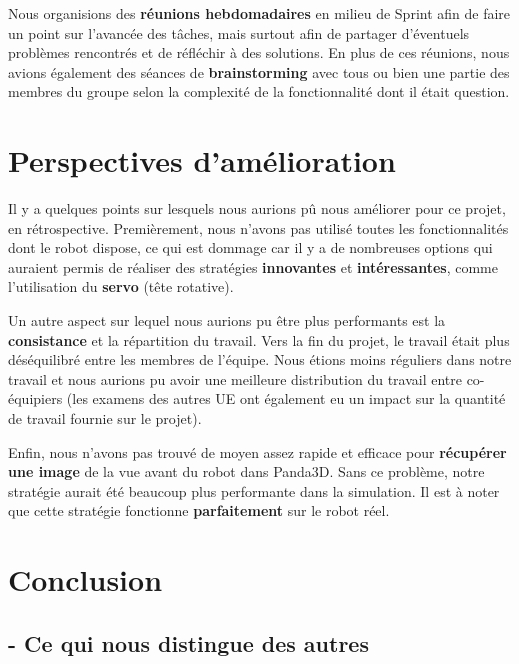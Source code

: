 \documentclass[12pt]{article}
\begin{document}
\hspace{\parindent}Nous organisions des \textbf{réunions hebdomadaires} en milieu de Sprint afin de faire un point sur l’avancée des tâches, mais surtout afin de partager d’éventuels problèmes rencontrés et de réfléchir à des solutions. En plus de ces réunions, nous avions également des séances de \textbf{brainstorming} avec tous ou bien une partie des membres du groupe selon la complexité de la fonctionnalité dont il était question.
 


\section*{Perspectives d'amélioration}

\hspace{\parindent}Il y a quelques points sur lesquels nous aurions pû nous améliorer pour ce projet, en rétrospective. Premièrement, nous n’avons pas utilisé toutes les fonctionnalités dont le robot dispose, ce qui est dommage car il y a de nombreuses options qui auraient permis de réaliser des stratégies \textbf{innovantes} et \textbf{intéressantes}, comme l'utilisation du \textbf{servo} (tête rotative).

\hspace{\parindent}Un autre aspect sur lequel nous aurions pu être plus performants est la \textbf{consistance} et la répartition du travail. Vers la fin du projet, le travail était plus déséquilibré entre les membres de l’équipe. Nous étions moins réguliers dans notre travail et nous aurions pu avoir une meilleure distribution du travail entre co-équipiers (les examens des autres UE ont également eu un impact sur la quantité de travail fournie sur le projet).

\hspace{\parindent} Enfin, nous n'avons pas trouvé de moyen assez rapide et efficace pour \textbf{récupérer une image} de la vue avant du robot dans Panda3D. Sans ce problème, notre stratégie aurait été beaucoup plus performante dans la simulation. Il est à noter que cette stratégie fonctionne \textbf{parfaitement} sur le robot réel. 


\newpage
\section*{Conclusion}

\subsection*{- Ce qui nous distingue des autres}
\end{document}
